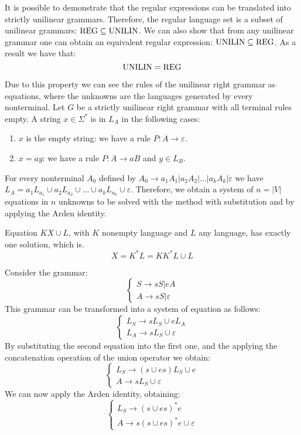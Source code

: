 It is possible to demonstrate that the regular expressions can be translated into strictly unilinear grammars. 
Therefore, the regular language set is a subset of unilinear grammars: $\textnormal{REG} \subseteq \textnormal{UNILIN}$. 
We can also show that from any unilinear grammar one can obtain an equivalent regular expression: $\textnormal{UNILIN} \subseteq \textnormal{REG}$.
As a result we have that: 
\[\textnormal{UNILIN}=\textnormal{REG}\]

Due to this property we can see the rules of the unilinear right grammar as equations, where the unknowns are the languages generated by every nonterminal. 
Let $G$ be a strictly unilinear right grammar with all terminal rules empty. 
A string $x \in \Sigma^{*}$ is in $L_A$ in the following cases: 
\begin{enumerate}
    \item $x$ is the empty string: we have a rule $P: A \rightarrow \varepsilon$. 
    \item $x=ay$: we have a rule $P: A \rightarrow aB$ and $y \in L_B$. 
\end{enumerate}
For every nonterminal $A_0$ defined by $A_0 \rightarrow a_1A_1|a_2A_2|\dots|a_kA_k|\varepsilon$ we have $L_A=a_1L_{a_1} \cup a_2L_{a_2} \cup \dots \cup a_kL_{a_k} \cup \varepsilon$. 
Therefore, we obtain a system of $n=\left\lvert V \right\rvert$ equations in $n$ unknowns to be solved with the method with substitution and by applying the Arden identity. 
\begin{definition}
    Equation $KX \cup L$, with $K$ nonempty language and $L$ any language, has exactly one solution, which is. 
    \[X=K^{*}L=KK^{*}L \cup L\]
\end{definition}
\begin{example}
    Consider the grammar: 
    \[
    \begin{cases}
        S \rightarrow sS | eA \\
        A \rightarrow sS | \varepsilon
    \end{cases}
    \]
    This grammar can be transformed into a system of equation as follows: 
    \[
    \begin{cases}
        L_S \rightarrow sL_S \cup eL_A \\
        L_A \rightarrow sL_S \cup \varepsilon
    \end{cases}
    \]
    By substituting the second equation into the first one, and the applying the concatenation operation of the union operator we obtain: 
    \[
    \begin{cases}
        L_S \rightarrow (s \cup es)L_S \cup e \\
        A \rightarrow sL_S \cup \varepsilon
    \end{cases}
    \]
    We can now apply the Arden identity, obtaining: 
    \[
    \begin{cases}
        L_S \rightarrow (s \cup es)^{*}e \\
        A \rightarrow s(s \cup es)^{*}e \cup \varepsilon
    \end{cases}
    \]
\end{example}

